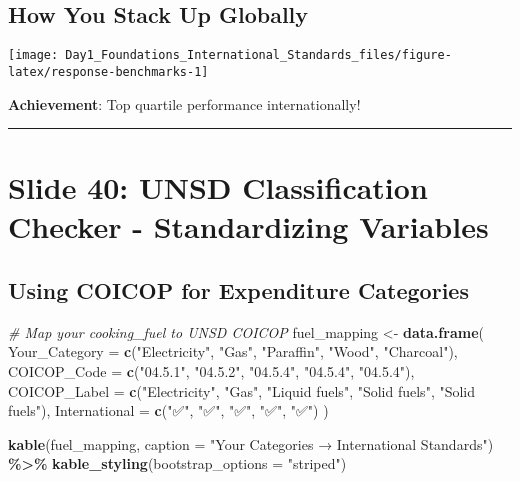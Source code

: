 \documentclass[
]{article}
\newenvironment{Shaded}{\begin{snugshade}}{\end{snugshade}}
\newcommand{\AttributeTok}[1]{\textcolor[rgb]{0.13,0.29,0.53}{#1}}
\newcommand{\CommentTok}[1]{\textcolor[rgb]{0.56,0.35,0.01}{\textit{#1}}}
\newcommand{\FunctionTok}[1]{\textcolor[rgb]{0.13,0.29,0.53}{\textbf{#1}}}
\newcommand{\NormalTok}[1]{#1}
\newcommand{\OtherTok}[1]{\textcolor[rgb]{0.56,0.35,0.01}{#1}}
\newcommand{\SpecialCharTok}[1]{\textcolor[rgb]{0.81,0.36,0.00}{\textbf{#1}}}
\newcommand{\StringTok}[1]{\textcolor[rgb]{0.31,0.60,0.02}{#1}}
\begin{document}
\subsection{How You Stack Up Globally}\label{how-you-stack-up-globally}

\texttt{[image: Day1\_Foundations\_International\_Standards\_files/figure-latex/response-benchmarks-1]}

\textbf{Achievement}: Top quartile performance internationally! 🌟

\begin{center}\rule{0.5\linewidth}{0.5pt}\end{center}

\section{Slide 40: UNSD Classification Checker - Standardizing
Variables}\label{slide-40-unsd-classification-checker---standardizing-variables}

\subsection{Using COICOP for Expenditure
Categories}\label{using-coicop-for-expenditure-categories}

\begin{Shaded}
\begin{Highlighting}[]
\CommentTok{\# Map your cooking\_fuel to UNSD COICOP}
\NormalTok{fuel\_mapping }\OtherTok{\textless{}{-}} \FunctionTok{data.frame}\NormalTok{(}
  \AttributeTok{Your\_Category =} \FunctionTok{c}\NormalTok{(}\StringTok{"Electricity"}\NormalTok{, }\StringTok{"Gas"}\NormalTok{, }\StringTok{"Paraffin"}\NormalTok{, }
                    \StringTok{"Wood"}\NormalTok{, }\StringTok{"Charcoal"}\NormalTok{),}
  \AttributeTok{COICOP\_Code =} \FunctionTok{c}\NormalTok{(}\StringTok{"04.5.1"}\NormalTok{, }\StringTok{"04.5.2"}\NormalTok{, }\StringTok{"04.5.4"}\NormalTok{, }
                  \StringTok{"04.5.4"}\NormalTok{, }\StringTok{"04.5.4"}\NormalTok{),}
  \AttributeTok{COICOP\_Label =} \FunctionTok{c}\NormalTok{(}\StringTok{"Electricity"}\NormalTok{, }\StringTok{"Gas"}\NormalTok{, }\StringTok{"Liquid fuels"}\NormalTok{,}
                   \StringTok{"Solid fuels"}\NormalTok{, }\StringTok{"Solid fuels"}\NormalTok{),}
  \AttributeTok{International =} \FunctionTok{c}\NormalTok{(}\StringTok{"✅"}\NormalTok{, }\StringTok{"✅"}\NormalTok{, }\StringTok{"✅"}\NormalTok{, }\StringTok{"✅"}\NormalTok{, }\StringTok{"✅"}\NormalTok{)}
\NormalTok{)}

\FunctionTok{kable}\NormalTok{(fuel\_mapping, }
      \AttributeTok{caption =} \StringTok{"Your Categories → International Standards"}\NormalTok{) }\SpecialCharTok{\%\textgreater{}\%}
  \FunctionTok{kable\_styling}\NormalTok{(}\AttributeTok{bootstrap\_options =} \StringTok{"striped"}\NormalTok{)}
\end{Highlighting}
\end{Shaded}
\end{document}
